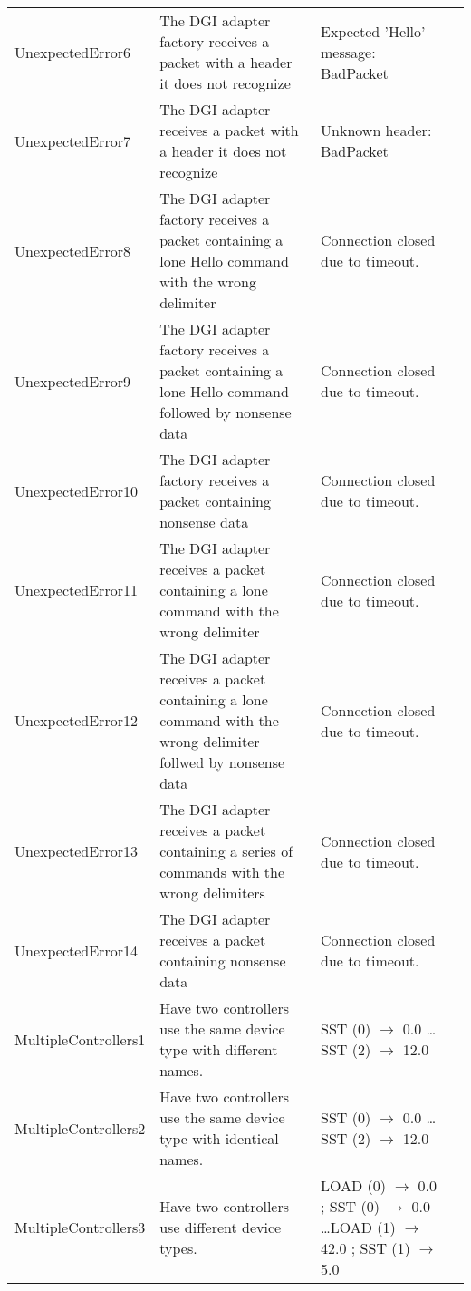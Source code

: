 \documentclass{article}
\begin{document}
\begin{center}
\begin{footnotesize}
\begin{longtable}{|p{3cm}|p{4cm}|p{10cm}|c|}
    UnexpectedError6 & The DGI adapter factory receives a packet with a header it does not recognize & Expected 'Hello' message: BadPacket & \\
    UnexpectedError7 & The DGI adapter receives a packet with a header it does not recognize & Unknown header: BadPacket & \\
    UnexpectedError8 & The DGI adapter factory receives a packet containing a lone Hello command with the wrong delimiter & Connection closed due to timeout. & \\
    UnexpectedError9 & The DGI adapter factory receives a packet containing a lone Hello command followed by nonsense data & Connection closed due to timeout. & \\
    UnexpectedError10 & The DGI adapter factory receives a packet containing nonsense data & Connection closed due to timeout. & \\
    UnexpectedError11 & The DGI adapter receives a packet containing a lone command with the wrong delimiter & Connection closed due to timeout. & \\
    UnexpectedError12 & The DGI adapter receives a packet containing a lone command with the wrong delimiter follwed by nonsense data & Connection closed due to timeout. & \\
    UnexpectedError13 & The DGI adapter receives a packet containing a series of commands with the wrong delimiters & Connection closed due to timeout. & \\
    UnexpectedError14 & The DGI adapter receives a packet containing nonsense data & Connection closed due to timeout. & \\
    MultipleControllers1 & Have two controllers use the same device type with different names. & SST (0) $\rightarrow$ 0.0 \newline \ldots \newline SST (2) $\rightarrow$ 12.0 & \\
    MultipleControllers2 & Have two controllers use the same device type with identical names. & SST (0) $\rightarrow$ 0.0 \newline \ldots \newline SST (2) $\rightarrow$ 12.0 & \\
    MultipleControllers3 & Have two controllers use different device types. & LOAD (0) $\rightarrow$ 0.0 ; SST (0) $\rightarrow$ 0.0 \newline \ldots \newline LOAD (1) $\rightarrow$ 42.0 ; SST (1) $\rightarrow$ 5.0 & \\

\end{longtable}
\end{footnotesize}
\end{center}
\end{document}
